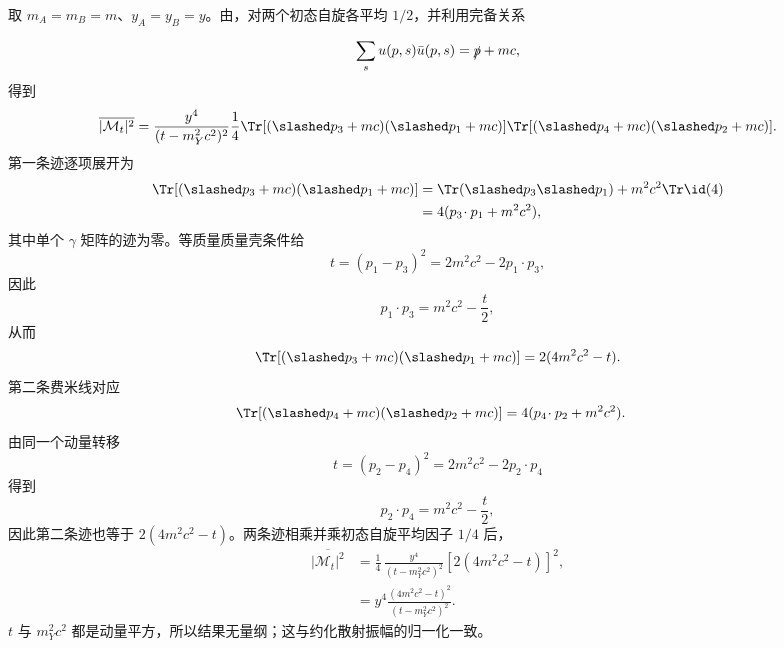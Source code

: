 \begin{derivation}
取 $m_A=m_B=m$、$y_A=y_B=y$。由，对两个初态自旋各平均 $1/2$，并利用完备关系

\begin{equation*}
 \sum_su(p,s)\bar u(p,s)=\slashed p+mc,
\end{equation*}
得到
\begin{equation*}
 \overline{|\mathcal M_t|^2}
 =\frac{y^4}{(t-m_Y^2c^2)^2}\frac14
 \Tr[(\slashed p_3+mc)(\slashed p_1+mc)]
 \Tr[(\slashed p_4+mc)(\slashed p_2+mc)].
\end{equation*}
第一条迹逐项展开为
\begin{align*}
 \Tr[(\slashed p_3+mc)(\slashed p_1+mc)]
 &=\Tr(\slashed p_3\slashed p_1)+m^2c^2\Tr\id(4)\\
 &=4(p_3\!\cdot p_1+m^2c^2),
\end{align*}
其中单个 $\gamma$ 矩阵的迹为零。等质量质量壳条件给
\begin{equation*}
 t=(p_1-p_3)^2=2m^2c^2-2p_1\!\cdot p_3,
\end{equation*}
因此
\begin{equation*}
 p_1\!\cdot p_3=m^2c^2-\frac t2,
\end{equation*}
从而
\begin{equation*}
 \Tr[(\slashed p_3+mc)(\slashed p_1+mc)]
 =2(4m^2c^2-t).
\end{equation*}
第二条费米线对应
\begin{align*}
 \Tr[(\slashed p_4+mc)(\slashed p_2+mc)]
 &=4(p_4\!\cdot p_2+m^2c^2).
\end{align*}
由同一个动量转移
\[
 t=(p_2-p_4)^2=2m^2c^2-2p_2\!\cdot p_4
\]
得到
\[
 p_2\!\cdot p_4=m^2c^2-\frac t2,
\]
因此第二条迹也等于 $2(4m^2c^2-t)$。两条迹相乘并乘初态自旋平均因子 $1/4$ 后，
\begin{align*}
 \overline{|\mathcal M_t|^2}
 &=\frac14\,
 \frac{y^4}{(t-m_Y^2c^2)^2}
 [2(4m^2c^2-t)]^2,\\
 &=y^4\frac{(4m^2c^2-t)^2}{(t-m_Y^2c^2)^2}.
\end{align*}
$t$ 与 $m_Y^2c^2$ 都是动量平方，所以结果无量纲；这与约化散射振幅的归一化一致。
\end{derivation}

